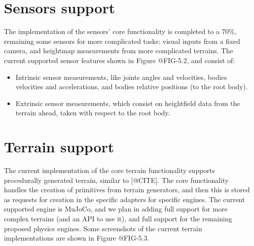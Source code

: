 \figProgressAgents

\section{Sensors support}

The implementation of the sensors' core functionality is completed to a 70\%,
remaining some sensors for more complicated tasks: visual inputs from a fixed camera,
and heightmap measurements from more complicated terrains. The current supported sensor
features shown in Figure @FIG-5.2, and consist of:

\begin{itemize}
    \item Intrinsic sensor measurements, like joints angles and velocities, bodies velocities
          and accelerations, and bodies relative positions (to the root body).
    \item Extrinsic sensor measurements, which consist on heightfield data from the terrain ahead,
          taken with respect to the root body.
\end{itemize}

\figProgressSensors

\section{Terrain support}

The current implementation of the core terrain functionality supports procedurally generated
terrain, similar to [@CITE]. The core functionality handles the creation of primitives from
terrain generators, and then this is stored as requests for creation in the specific
adapters for specific engines. The current supported engine is MuJoCo, and we plan in adding
full support for more complex terrains (and an API to use it), and full support for the remaining
proposed physics engines. Some screenshots of the current terrain implementations are shown
in Figure @FIG-5.3.

\figProgressTerrains